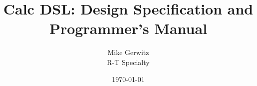 \documentclass[10pt]{book}
\author{Mike Gerwitz\\R-T Specialty}
\date{\today}
\begin{document}
\title{Calc DSL: Design Specification and Programmer's Manual}
\maketitle

\tableofcontents


\end{document}
